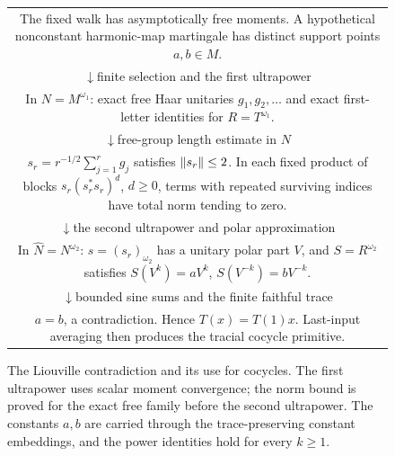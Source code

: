 \begin{figure}[htbp]
\centering
\small
\begin{tabular}{c}
\fbox{\parbox{0.86\linewidth}{\centering
The fixed walk has asymptotically free moments.\\
A hypothetical nonconstant harmonic-map martingale has\\
distinct support points $a,b\in M$.}}\\[3pt]
$\downarrow$\quad finite selection and the first ultrapower\\[3pt]
\fbox{\parbox{0.86\linewidth}{\centering
In $N=M^{\omega_1}$: exact free Haar unitaries $g_1,g_2,\ldots$\\
and exact first-letter identities for $R=T^{\omega_1}$.}}\\[3pt]
$\downarrow$\quad free-group length estimate in $N$\\[3pt]
\fbox{\parbox{0.86\linewidth}{\centering
$s_r=r^{-1/2}\sum_{j=1}^r g_j$ satisfies $\norm{s_r}\leq2$.\\
In each fixed product of blocks $s_r(s_r^*s_r)^d$, $d\geq0$,\\
terms with repeated surviving indices have total norm tending to zero.}}\\[3pt]
$\downarrow$\quad the second ultrapower and polar approximation\\[3pt]
\fbox{\parbox{0.86\linewidth}{\centering
In $\widehat N=N^{\omega_2}$: $s=(s_r)_{\omega_2}$ has a unitary
polar part $V$,\\
and $S=R^{\omega_2}$ satisfies $S(V^k)=aV^k$, $S(V^{-k})=bV^{-k}$.}}\\[3pt]
$\downarrow$\quad bounded sine sums and the finite faithful trace\\[3pt]
\fbox{\parbox{0.86\linewidth}{\centering
$a=b$, a contradiction. Hence $T(x)=T(1)x$.\\
Last-input averaging then produces the tracial cocycle primitive.}}
\end{tabular}
\caption{The Liouville contradiction and its use for cocycles.
The first ultrapower uses scalar moment convergence; the norm bound
is proved for the exact free family before the second ultrapower.
The constants $a,b$ are carried through the trace-preserving constant
embeddings, and the power identities hold for every $k\geq1$.}
\label{fig:proof-map}
\end{figure}
